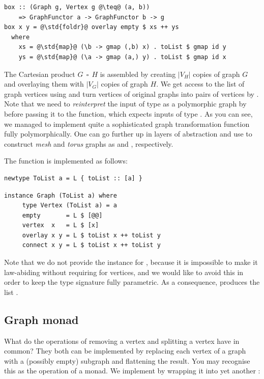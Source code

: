 \begin{verbatim}
box :: (Graph g, Vertex g @\teq@ (a, b))
    => GraphFunctor a -> GraphFunctor b -> g
box x y = @\std{foldr}@ overlay empty $ xs ++ ys
  where
    xs = @\std{map}@ (\b -> gmap (,b) x) . toList $ gmap id y
    ys = @\std{map}@ (\a -> gmap (a,) y) . toList $ gmap id x
\end{verbatim}

The Cartesian product $G~~\square~~H$ is assembled by creating $|V_H|$ copies
of graph $G$ and overlaying them with $|V_G|$ copies of graph $H$. We get
access to the list of graph vertices using  and turn vertices of
original graphs into pairs of vertices by . Note that we need to
\emph{reinterpret} the input of type  as a polymorphic graph
by  before passing it to the  function, which expects
inputs of type . As you can see, we managed to implement quite
a sophisticated graph transformation function  fully polymorphically.
One can go further up in layers of abstraction and use  to construct
\emph{mesh} and \emph{torus} graphs as
 and
, respectively.

The  function is implemented as follows:

\begin{verbatim}
newtype ToList a = L { toList :: [a] }
\end{verbatim}
\vspace{1mm}
\begin{verbatim}
instance Graph (ToList a) where
     type Vertex (ToList a) = a
     empty       = L $ [@@]
     vertex  x   = L $ [x]
     overlay x y = L $ toList x ++ toList y
     connect x y = L $ toList x ++ toList y
\end{verbatim}

\noindent
Note that we do not provide the  instance for , because it
is impossible to make it law-abiding without requiring  for vertices,
and we would like to avoid this in order to keep the  type signature
fully parametric. As a consequence,  produces the
list \hs{[1,1]}.

\subsection{Graph monad}\label{sub-monad}

What do the operations of removing a vertex and splitting a vertex have in common?
They both can be implemented by replacing each vertex of a graph with a (possibly empty)
subgraph and flattening the result. You may recognise this as the  operation
of a monad. We implement  by wrapping it into yet another :

